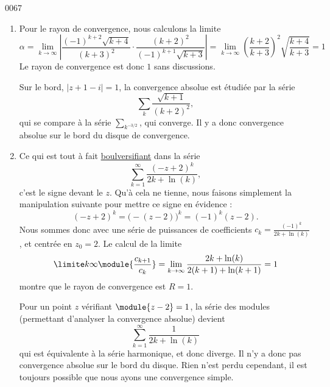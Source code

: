 \begin{corrige}{0067}
\begin{enumerate}
\item
Pour le rayon de convergence, nous calculons la limite
\begin{equation}
	\alpha=\lim_{k\to\infty}\left| \frac{ (-1)^{k+2}\sqrt{k+4} }{ (k+3)^2 }\cdot\frac{ (k+2)^2 }{ (-1)^{k+1}\sqrt{k+3} } \right| =\lim_{k\to \infty}\left( \frac{ k+2 }{ k+3 } \right)^2\sqrt{\frac{ k+4 }{ k+3 }}=1
\end{equation}
Le rayon de convergence est donc $1$ sans discussions.

Sur le bord, $| z+1-i |=1$, la convergence absolue est étudiée par la série
\begin{equation}
	\sum_k\frac{ \sqrt{k+1} }{ (k+2)^2 },
\end{equation}
qui se compare à la série $\sum_{k^{-3/2}}$, qui converge. Il y a donc convergence absolue sur le bord du disque de convergence.

\item
Ce qui est tout à fait \href{http://www.youtube.com/watch?v=5O2bOElnbOQ}{boulversifiant} dans la série
\begin{equation*}
	\sum_{k=1}^\infty \frac{{(-z + 2)}^k}{2k + \ln(k)},
\end{equation*}
c'est le signe devant le $z$. Qu'à cela ne tienne, nous faisons simplement la manipulation suivante pour mettre ce signe en évidence :
\begin{equation}
	(-z+2)^k=\big( -(z-2) \big)^k=(-1)^k(z-2).
\end{equation}
Nous sommes donc avec une série de puissances de coefficients $c_k = \frac{ (-1)^k }{ 2k+\ln(k) }$, et centrée en $z_0 = 2$. Le calcul de la limite
\begin{equation*}
	\limite k \infty \module{\frac{c_{k+1}}{c_k}}=\lim_{k\to\infty}\frac{ 2k+\ln(k) }{ 2(k+1)+\ln(k+1) }=1
\end{equation*}
montre que le rayon de convergence est $R = 1$.

Pour un point $z$ vérifiant $\module{z-2} = 1$, la série des modules (permettant d'analyser la convergence absolue) devient
\begin{equation*}
\sum_{k=1}^\infty \frac{1}{2k + \ln(k)}
\end{equation*}
qui est équivalente à la série harmonique, et donc diverge. Il n'y a donc pas convergence absolue sur le bord du disque. Rien n'est perdu cependant, il est toujours possible que nous ayons une convergence simple.


\end{enumerate}
\end{corrige}
